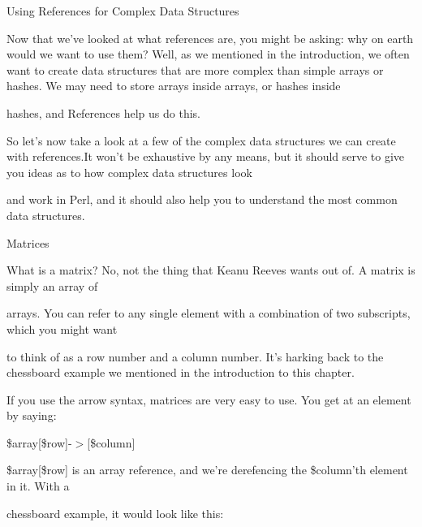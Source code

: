 \documentclass[a4paper,11pt]{book}
\begin{document}
\noindent Using References for Complex Data Structures

\noindent 

\noindent Now that we've looked at what references are, you might be asking: why on earth would we want to use them? Well, as we mentioned in the introduction, we often want to create data structures that are more complex than simple arrays or hashes. We may need to store arrays inside arrays, or hashes inside

\noindent hashes, and References help us do this.

\noindent 

\noindent So let's now take a look at a few of the complex data structures we can create with references.It won't be exhaustive by any means, but it should serve to give you ideas as to how complex data structures look

\noindent and work in Perl, and it should also help you to understand the most common data structures.

\noindent 

\noindent Matrices

\noindent 

\noindent What is a matrix? No, not the thing that Keanu Reeves wants out of. A matrix is simply an array of

\noindent arrays. You can refer to any single element with a combination of two subscripts, which you might want

\noindent to think of as a row number and a column number. It's harking back to the chessboard example we mentioned in the introduction to this chapter.

\noindent 

\noindent If you use the arrow syntax, matrices are very easy to use. You get at an element by saying:

\noindent 

\noindent \$array[\$row]-$>$[\$column]

\noindent 

\noindent 

\noindent \$array[\$row] is an array reference, and we're derefencing the \$column'th element in it. With a

\noindent chessboard example, it would look like this:

\noindent 

\noindent 
\end{document}

